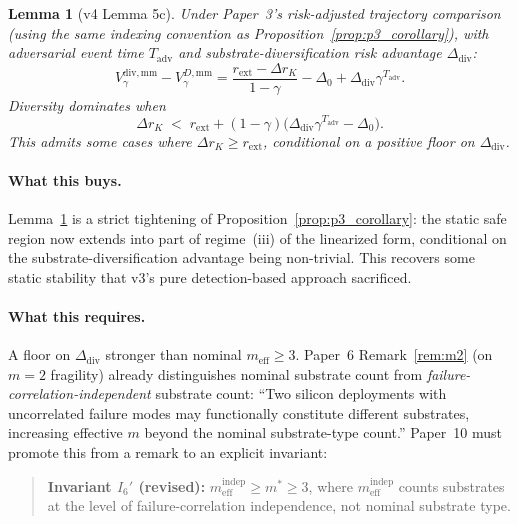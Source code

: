 \documentclass{article}
\newtheorem{lemma}{Lemma}
\newcommand{\rext}{r_{\mathrm{ext}}}
\newcommand{\meff}{m_{\mathrm{eff}}}
\newcommand{\Vdisc}{V_{\gamma}}
\begin{document}
\begin{lemma}[v4 Lemma 5c]
\label{lem:v4c}
Under Paper~3's risk-adjusted trajectory comparison (using the same
indexing convention as
Proposition~\ref{prop:p3_corollary}), with adversarial event time
$T_{\mathrm{adv}}$ and substrate-diversification risk advantage
$\Delta_{\mathrm{div}}$:
\begin{equation}
\label{eq:minimax_lift}
\Vdisc^{\mathrm{div,mm}} - \Vdisc^{D,\mathrm{mm}}
  = \frac{\rext - \Delta r_K}{1-\gamma} - \Delta_0 +
    \Delta_{\mathrm{div}} \gamma^{T_{\mathrm{adv}}}.
\end{equation}
Diversity dominates when
\begin{equation}
\label{eq:minimax_threshold}
\Delta r_K \;<\; \rext + (1-\gamma)\bigl(\Delta_{\mathrm{div}}
  \gamma^{T_{\mathrm{adv}}} - \Delta_0\bigr).
\end{equation}
This admits some cases where $\Delta r_K \geq \rext$, conditional on a
positive floor on $\Delta_{\mathrm{div}}$.
\end{lemma}

\paragraph{What this buys.}
Lemma~\ref{lem:v4c} is a strict tightening of
Proposition~\ref{prop:p3_corollary}: the static safe region now extends
into part of regime~(iii) of the linearized form, conditional on the
substrate-diversification advantage being non-trivial.  This recovers
some static stability that v3's pure detection-based approach
sacrificed.

\paragraph{What this requires.}
A floor on $\Delta_{\mathrm{div}}$ stronger than nominal $\meff \geq
3$.  Paper~6 Remark~\ref{rem:m2} (on $m=2$ fragility) already
distinguishes nominal substrate count from
\emph{failure-correlation-independent} substrate count: ``Two silicon
deployments with uncorrelated failure modes may functionally
constitute different substrates, increasing effective $m$ beyond the
nominal substrate-type count.''  Paper~10 must promote this from a
remark to an explicit invariant:

\begin{quote}
\textbf{Invariant $I_6'$ (revised):} $\meff^{\mathrm{indep}} \geq m^*
\geq 3$, where $\meff^{\mathrm{indep}}$ counts substrates at the level
of failure-correlation independence, not nominal substrate type.
\end{quote}
\end{document}
